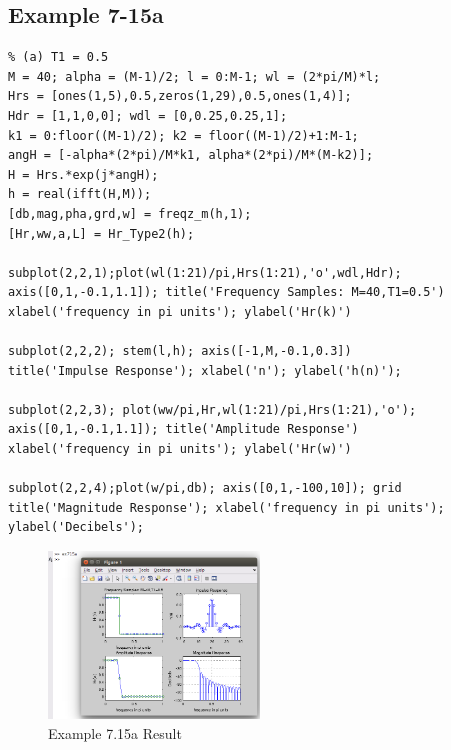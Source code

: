 \documentclass[11pt
  , a4paper
  , article
  , oneside
]{memoir}
\begin{document}
\subsection{Example 7-15a}
\begin{lstlisting}[style=termstyle]
% Example 7.15a
% (a) T1 = 0.5
M = 40; alpha = (M-1)/2; l = 0:M-1; wl = (2*pi/M)*l;
Hrs = [ones(1,5),0.5,zeros(1,29),0.5,ones(1,4)];
Hdr = [1,1,0,0]; wdl = [0,0.25,0.25,1];
k1 = 0:floor((M-1)/2); k2 = floor((M-1)/2)+1:M-1;
angH = [-alpha*(2*pi)/M*k1, alpha*(2*pi)/M*(M-k2)];
H = Hrs.*exp(j*angH);
h = real(ifft(H,M));
[db,mag,pha,grd,w] = freqz_m(h,1);
[Hr,ww,a,L] = Hr_Type2(h);

subplot(2,2,1);plot(wl(1:21)/pi,Hrs(1:21),'o',wdl,Hdr); 
axis([0,1,-0.1,1.1]); title('Frequency Samples: M=40,T1=0.5')
xlabel('frequency in pi units'); ylabel('Hr(k)')

subplot(2,2,2); stem(l,h); axis([-1,M,-0.1,0.3])
title('Impulse Response'); xlabel('n'); ylabel('h(n)');

subplot(2,2,3); plot(ww/pi,Hr,wl(1:21)/pi,Hrs(1:21),'o');
axis([0,1,-0.1,1.1]); title('Amplitude Response')
xlabel('frequency in pi units'); ylabel('Hr(w)')

subplot(2,2,4);plot(w/pi,db); axis([0,1,-100,10]); grid
title('Magnitude Response'); xlabel('frequency in pi units');
ylabel('Decibels');

\end{lstlisting}

\begin{figure}[h!]
	\centering
	\includegraphics[width=0.5\textwidth,height=0.4\textwidth]{./images/ex715a.png}
	\caption{Example 7.15a Result}
	\label{fig:Example 7.15a Result}
\end{figure}

\clearpage
\end{document}
